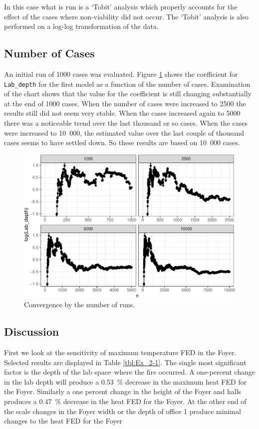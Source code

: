 \documentclass[12pt,twoside]{book}
\begin{document}
In this case what is run is a `Tobit' analysis\cite{Tobin:1958} which properly accounts for the effect of the cases where non-viability did not occur. The `Tobit' analysis is also performed on a log-log transformation of the data.

\hypertarget{number-of-cases}{%
\subsection{Number of Cases}\label{number-of-cases}}

An initial run of 1000 cases was evaluated. Figure \ref{Ex_2-convergence_of_mean} shows the coefficient for \texttt{Lab\_depth} for the first model as a function of the number of cases. Examination of the chart shows that the value for the coefficient is still changing substantially at the end of 1000 cases. When the number of cases were increased to 2500 the results still did not seem very stable. When the cases increased again to 5000 there was a noticeable trend over the last thousand or so cases. When the cases were increased to 10~000, the estimated value over the last couple of thousand cases seems to have settled down. So these results are based on 10~000 cases.

\begin{figure}[h!]
\centering
\includegraphics[width=4.5in]{FIGURES/ex2_cvg_plot-1.pdf}
\caption{Convergence by the number of runs.}
\label{Ex_2-convergence_of_mean}
\end{figure}

\hypertarget{discussion}{%
\subsection{Discussion}\label{discussion}}

First we look at the sensitivity of maximum temperature FED in the Foyer. Selected results are displayed in Table  \ref{tbl:Ex_2-1}. The single most significant factor is the depth of the lab space--where the fire occurred. A one-percent change in the lab depth will produce a 0.53~\% decrease in the maximum heat FED for the Foyer. Similarly a one percent change in the height of the Foyer and halls produces a 0.47~\% decrease in the heat FED for the Foyer. At the other end of the scale changes in the Foyer width or the depth of office 1 produce minimal changes to the heat FED for the Foyer
\end{document}
